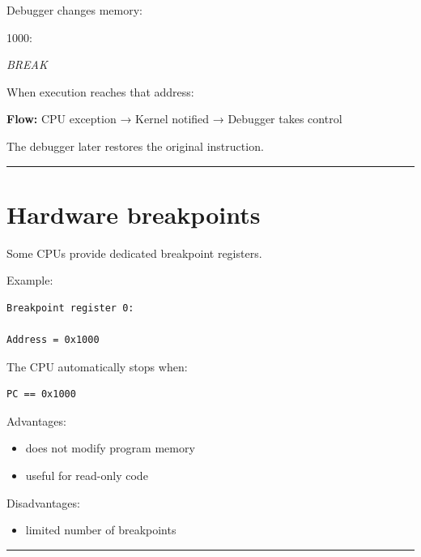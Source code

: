 \documentclass[
  oneside,
  openany]{book}
\newenvironment{Shaded}{\begin{snugshade}}{\end{snugshade}}
\newcommand{\NormalTok}[1]{#1}
\newcommand{\PreprocessorTok}[1]{\textcolor[rgb]{0.56,0.35,0.01}{\textit{#1}}}
\providecommand{\tightlist}{%
  \setlength{\itemsep}{0pt}\setlength{\parskip}{0pt}}
\begin{document}
Debugger changes memory:

\begin{Shaded}
\begin{Highlighting}[]
\NormalTok{1000:}

\PreprocessorTok{BREAK}
\end{Highlighting}
\end{Shaded}

When execution reaches that address:

\textbf{Flow:} CPU exception → Kernel notified → Debugger takes control

The debugger later restores the original instruction.

\begin{center}\rule{0.5\linewidth}{0.5pt}\end{center}

\hypertarget{hardware-breakpoints}{%
\section{Hardware breakpoints}\label{hardware-breakpoints}}

Some CPUs provide dedicated breakpoint registers.

Example:

\begin{verbatim}
Breakpoint register 0:

Address = 0x1000
\end{verbatim}

The CPU automatically stops when:

\begin{verbatim}
PC == 0x1000
\end{verbatim}

Advantages:

\begin{itemize}
\tightlist
\item
  does not modify program memory
\item
  useful for read-only code
\end{itemize}

Disadvantages:

\begin{itemize}
\tightlist
\item
  limited number of breakpoints
\end{itemize}

\begin{center}\rule{0.5\linewidth}{0.5pt}\end{center}
\end{document}
